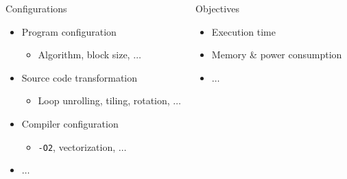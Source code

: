 \documentclass[10pt, compress, aspectratio=169, xcolor={table,usenames,dvipsnames}]{beamer}
\begin{document}
\begin{frame}
\begin{columns}[c]
            \begin{block}{Configurations}
                \begin{itemize}
                    \item Program configuration
                        \begin{itemize}
                            \item Algorithm, block size, $\dots$
                        \end{itemize}
                    \item Source code transformation
                        \begin{itemize}
                            \item Loop unrolling, tiling, rotation, $\dots$
                        \end{itemize}
                    \item Compiler configuration
                        \begin{itemize}
                            \item \texttt{-O2}, vectorization, $\dots$
                        \end{itemize}
                    \item $\dots$
                \end{itemize}
            \end{block}

            \begin{block}{Objectives}
                \begin{itemize}
                    \item Execution time
                    \item Memory \& power consumption
                    \item $\dots$
                \end{itemize}
            \end{block}

    \end{columns}
\end{frame}
\end{document}
